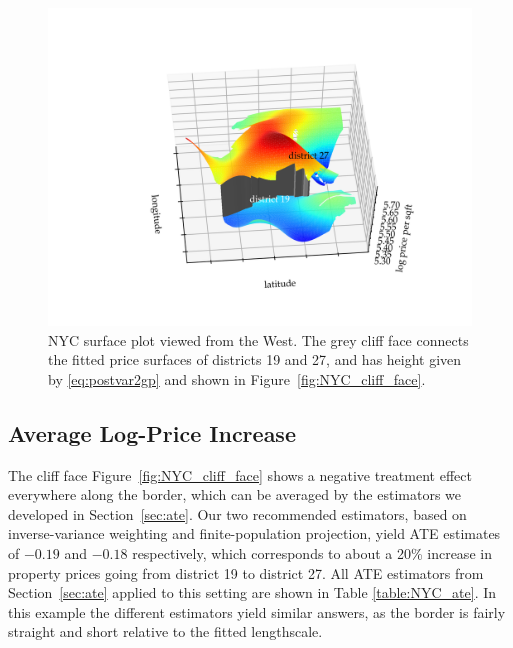 \documentclass[letter]{article}
\makeatletter
\def\maxwidth{\ifdim\Gin@nat@width>\linewidth\linewidth
\else\Gin@nat@width\fi}
\let\Oldincludegraphics\includegraphics
\renewcommand{\includegraphics}[1]{\Oldincludegraphics[width=0.9\maxwidth]{#1}}
\makeatother
\begin{document}
    	\begin{figure}
\centering
\includegraphics{../NYC/NYC_plots/NYC_surface_plot_multi_ev60az175.png}
\caption{\label{fig:NYC_3d}NYC surface plot viewed from the West. The grey cliff face connects the fitted price surfaces of districts 19 and 27, and has height given by \eqref{eq:postvar2gp} and shown in Figure~\ref{fig:NYC_cliff_face}.}
\end{figure}
    


    	\subsection{Average Log-Price Increase}\label{average-log-price-increase}

The cliff face Figure~\ref{fig:NYC_cliff_face} shows a negative treatment effect everywhere along the border, which can be averaged by the estimators we developed in Section~\ref{sec:ate}.
Our two recommended estimators, based on inverse-variance weighting and finite-population projection, yield ATE estimates of \(-0.19\) and \(-0.18\) respectively, which corresponds to about a 20\% increase in property prices going from district 19 to district 27.
All ATE estimators from Section~\ref{sec:ate} applied to this setting are shown in Table \ref{table:NYC_ate}.
In this example the different estimators yield similar answers, as the border is fairly straight and short relative to the fitted lengthscale.
    
\end{document}
